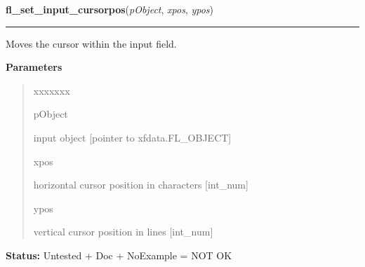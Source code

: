 \hspace{.8\funcindent}\begin{boxedminipage}{\funcwidth}

    \raggedright \textbf{fl\_set\_input\_cursorpos}(\textit{pObject}, \textit{xpos}, \textit{ypos})

    \vspace{-1.5ex}

    \rule{\textwidth}{0.5\fboxrule}
\setlength{\parskip}{2ex}
    Moves the cursor within the input field.

\setlength{\parskip}{1ex}
      \textbf{Parameters}
      \vspace{-1ex}

      \begin{quote}
        \begin{Ventry}{xxxxxxx}

          \item[pObject]

          input object [pointer to xfdata.FL\_OBJECT]

          \item[xpos]

          horizontal cursor position in characters [int\_num]

          \item[ypos]

          vertical cursor position in lines [int\_num]

        \end{Ventry}

      \end{quote}

\textbf{Status:} Untested + Doc + NoExample = NOT OK



    \end{boxedminipage}

    \label{xformslib:library:fl_set_input_selected}

    \vspace{0.5ex}


